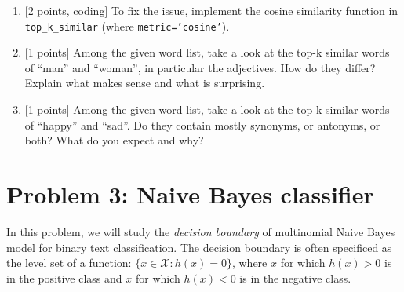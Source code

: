 \documentclass{article}
\theoremstyle{case}
\theoremstyle{definition}
\begin{document}
\begin{enumerate}
    \newpage
    \item {[2 points, coding]} To fix the issue, implement the cosine similarity function in \texttt{top\_k\_similar} (where \texttt{metric='cosine'}).
        \begin{shaded}
            
        \end{shaded}

    \newpage
    \item {[1 points]} Among the given word list, take a look at the top-k similar words of ``man'' and ``woman'', in particular the adjectives. How do they differ? Explain what makes sense and what is surprising.
        \begin{shaded}
        \end{shaded}

    \newpage
    \item {[1 points]} Among the given word list, take a look at the top-k similar words of ``happy'' and ``sad''. Do they contain mostly synonyms, or antonyms, or both? What do you expect and why? 
        \begin{shaded}
        \end{shaded}

\end{enumerate}

\newpage

\section*{Problem 3: Naive Bayes classifier}
In this problem, we will study the \emph{decision boundary} of multinomial Naive Bayes model for binary text classification.
The decision boundary is often specificed as the level set of a function:
$\{x\in\mathcal{X} : h(x) = 0\}$,
where $x$ for which $h(x) > 0$ is in the positive class and
$x$ for which $h(x) < 0$ is in the negative class.
\end{document}
